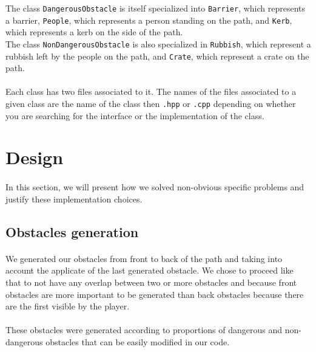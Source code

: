 \documentclass[a4paper, 11pt, oneside]{article}
\begin{document}
The class \texttt{DangerousObstacle} is itself specialized into \texttt{Barrier}, which represents a barrier, \texttt{People}, which represents a person standing on the path, and \texttt{Kerb}, which represents a kerb on the side of the path.\\ \newline
The class \texttt{NonDangerousObstacle} is also specialized in \texttt{Rubbish}, which represent a rubbish left by the people on the path, and \texttt{Crate}, which represent a crate on the path.

\paragraph{}Each class has two files associated to it. The names of the files associated to a given class are the name of the class then \texttt{.hpp} or \texttt{.cpp} depending on whether you are searching for the interface or the implementation of the class.



\section{Design}
\paragraph{}In this section, we will present how we solved non-obvious specific problems and justify these implementation choices.

\subsection{Obstacles generation}
\paragraph{}We generated our obstacles from front to back of the path and taking into account the applicate of the last generated obstacle. We chose to proceed 
like that to not have any overlap between two or more obstacles and because front obstacles are more important to be generated than back obstacles because there are the first visible by the player.
\paragraph{}These obstacles were generated according to proportions of dangerous and non-dangerous obstacles that can be easily modified in our code.
\end{document}
